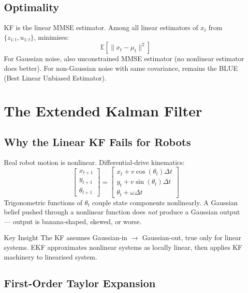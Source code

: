 \documentclass[11pt,a4paper]{article}
\begin{document}
\subsection{Optimality}

KF is the linear MMSE estimator. Among all linear estimators of $x_t$ from $\{z_{1:t}, u_{1:t}\}$, minimises:
\[
\mathbb{E}[\|x_t - \mu_t\|^2]
\]
For Gaussian noise, also unconstrained MMSE estimator (no nonlinear estimator does better). For non-Gaussian noise with same covariance, remains the BLUE (Best Linear Unbiased Estimator).

\section{The Extended Kalman Filter}

\subsection{Why the Linear KF Fails for Robots}

Real robot motion is nonlinear. Differential-drive kinematics:
\[
\begin{bmatrix}x_{t+1} \\ y_{t+1} \\ \theta_{t+1}\end{bmatrix} = \begin{bmatrix}x_t + v\cos(\theta_t)\Delta t \\ y_t + v\sin(\theta_t)\Delta t \\ \theta_t + \omega \Delta t\end{bmatrix}
\]
Trigonometric functions of $\theta_t$ couple state components nonlinearly. A Gaussian belief pushed through a nonlinear function does \emph{not} produce a Gaussian output --- output is banana-shaped, skewed, or worse.

\begin{insightbox}{Key Insight}
The KF assumes Gaussian-in $\to$ Gaussian-out, true only for linear systems. EKF approximates nonlinear systems as locally linear, then applies KF machinery to linearised system.
\end{insightbox}

\subsection{First-Order Taylor Expansion}
\end{document}
